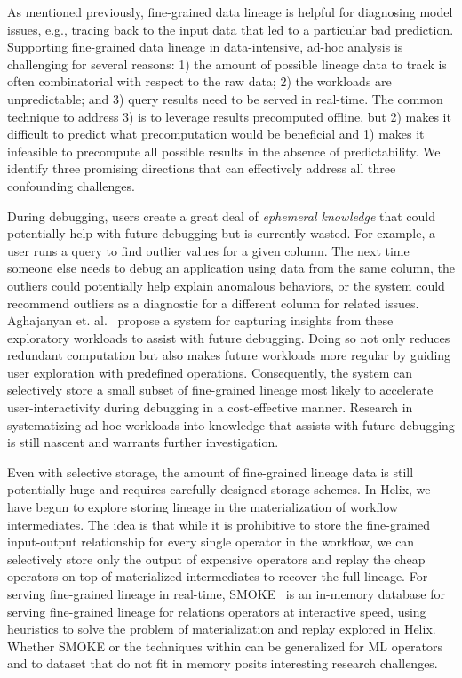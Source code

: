 \documentclass[11pt,dvipdfmx]{article}
\newcommand{\topic}[1]{\vspace{-3.5pt}\smallskip \smallskip \noindent{\bf #1.}}
\newcommand{\helix}{{\sc Helix}\xspace}
\begin{document}
\topic{Fine-grained}
As mentioned previously, fine-grained data lineage is helpful for diagnosing model issues,
e.g., tracing back to the input data that led to a particular bad prediction.
Supporting fine-grained data lineage in data-intensive, ad-hoc analysis is challenging for several reasons:
1) the amount of possible lineage data to track is often combinatorial with respect to the raw data;
2) the workloads are unpredictable; and
3) query results need to be served in real-time. 
The common technique to address 3) is to leverage results precomputed offline,
but 2) makes it difficult to predict what precomputation would be beneficial 
and 1) makes it infeasible to precompute all possible results in the absence of predictability.
We identify three promising directions that can effectively address all three confounding challenges.


During debugging, users create a great deal of \textit{ephemeral knowledge} 
that could potentially help with future debugging but is currently wasted. 
For example, a user runs a query to find outlier values for a given column. 
The next time someone else needs to debug an application using data from the same column, 
the outliers could potentially help explain anomalous behaviors, 
or the system could recommend outliers as a diagnostic for a different column for related issues.
Aghajanyan et. al.~\cite{aghajanyan2019signal} propose a system for capturing insights from these exploratory workloads to assist with future debugging. 
Doing so not only reduces redundant computation but also makes future workloads more regular by guiding user exploration with predefined operations.
Consequently, the system can selectively store a small subset of fine-grained lineage most likely to accelerate user-interactivity during debugging in a cost-effective manner.
Research in systematizing ad-hoc workloads into knowledge that assists with future debugging is still nascent and warrants further investigation.

Even with selective storage, the amount of fine-grained lineage data is still potentially huge 
and requires carefully designed storage schemes.  
In \helix, we have begun to explore storing lineage in the materialization of workflow intermediates. 
The idea is that while it is prohibitive to store the fine-grained input-output relationship 
for every single operator in the workflow,
we can selectively store only the output of expensive operators 
and replay the cheap operators on top of materialized intermediates to recover the full lineage.
For serving fine-grained lineage in real-time, SMOKE~\cite{psallidas2018smoke} is 
an in-memory database for serving fine-grained lineage for relations operators
at interactive speed,
using heuristics to solve the problem of materialization and replay explored in \helix.
Whether SMOKE or the techniques within can be generalized for ML operators and to dataset that do not fit in memory posits interesting research challenges.
\end{document}

